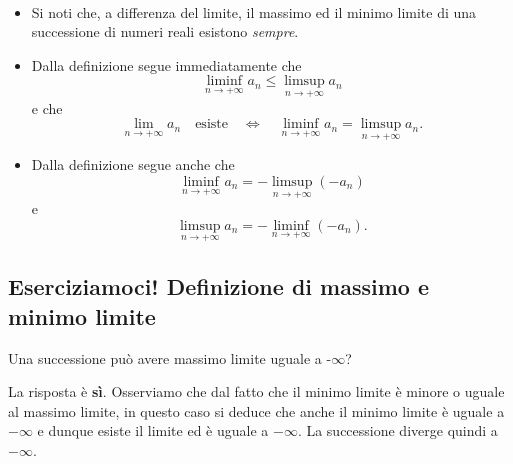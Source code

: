 \begin{observes}~
\begin{itemize}
	\item Si noti che, a differenza del limite, il massimo ed il minimo limite di una successione di numeri reali esistono \textit{sempre}.
	\item Dalla definizione segue immediatamente che
	\begin{equation*}
		\liminf_{n\to +\infty} a_{n} \leq \limsup_{n\to +\infty} a_{n}
	\end{equation*}
	e che
	\begin{equation*}
		\lim_{n\to +\infty} a_n \quad \mbox{esiste} \quad \iff \quad \liminf_{n\to +\infty} a_{n} =\limsup_{n\to +\infty} a_{n}.
	\end{equation*}
	\item Dalla definizione segue anche che
	\begin{equation*}
		\liminf_{n\to +\infty} a_{n} = - \limsup_{n\to +\infty} (-a_{n})
	\end{equation*}
	e
	\begin{equation*}
		\limsup_{n\to +\infty} a_{n} = - \liminf_{n\to +\infty} (-a_{n}).
	\end{equation*}
\end{itemize}
\end{observes}
\subsection{Eserciziamoci! Definizione di massimo e minimo limite}
\begin{example}
Una successione può avere massimo limite uguale a -$\infty$?
\end{example}
\begin{solution}
La risposta è \textbf{sì}. Osserviamo che dal fatto che il minimo limite è minore o uguale al massimo limite, in questo caso si deduce che anche il minimo limite è uguale a $-\infty$ e dunque esiste il limite ed è uguale a $-\infty$. La successione diverge quindi a $-\infty$.
\end{solution}
